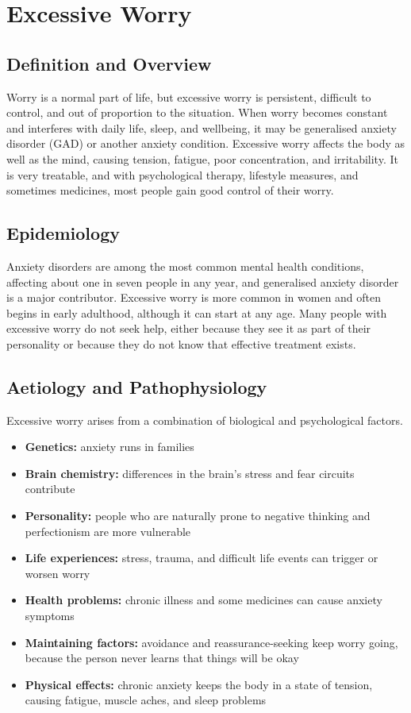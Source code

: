 \chapter{Excessive Worry}

\section*{Definition and Overview}
Worry is a normal part of life, but excessive worry is persistent, difficult to control, and out of proportion to the situation. When worry becomes constant and interferes with daily life, sleep, and wellbeing, it may be generalised anxiety disorder (GAD) or another anxiety condition. Excessive worry affects the body as well as the mind, causing tension, fatigue, poor concentration, and irritability. It is very treatable, and with psychological therapy, lifestyle measures, and sometimes medicines, most people gain good control of their worry.

\section*{Epidemiology}
Anxiety disorders are among the most common mental health conditions, affecting about one in seven people in any year, and generalised anxiety disorder is a major contributor. Excessive worry is more common in women and often begins in early adulthood, although it can start at any age. Many people with excessive worry do not seek help, either because they see it as part of their personality or because they do not know that effective treatment exists.

\section*{Aetiology and Pathophysiology}
Excessive worry arises from a combination of biological and psychological factors.
\begin{itemize}
    \item \textbf{Genetics:} anxiety runs in families
    \item \textbf{Brain chemistry:} differences in the brain's stress and fear circuits contribute
    \item \textbf{Personality:} people who are naturally prone to negative thinking and perfectionism are more vulnerable
    \item \textbf{Life experiences:} stress, trauma, and difficult life events can trigger or worsen worry
    \item \textbf{Health problems:} chronic illness and some medicines can cause anxiety symptoms
    \item \textbf{Maintaining factors:} avoidance and reassurance-seeking keep worry going, because the person never learns that things will be okay
    \item \textbf{Physical effects:} chronic anxiety keeps the body in a state of tension, causing fatigue, muscle aches, and sleep problems
\end{itemize}

